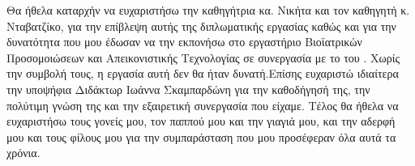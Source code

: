\begin{acknowledgements}
Θα ήθελα καταρχήν να ευχαριστήσω την καθηγήτρια κα. Νικήτα και 
τον καθηγητή κ. Νταβατζίκο, για την επίβλεψη αυτής της 
διπλωματικής εργασίας καθώς και για την δυνατότητα που μου έδωσαν
να την εκπονήσω στο εργαστήριο Βιοϊατρικών Προσομοιώσεων και 
Απεικονιστικής Τεχνολογίας σε συνεργασία με το  του . Χωρίς
την συμβολή τους, η εργασία αυτή δεν θα ήταν δυνατή.Επίσης 
ευχαριστώ ιδιαίτερα την υποψήφια Διδάκτωρ Ιωάννα Σκαμπαρδώνη για
την καθοδήγησή της, την πολύτιμη γνώση της και την εξαιρετική 
συνεργασία που είχαμε. Τέλος θα ήθελα να ευχαριστήσω τους γονείς
μου, τον παππού μου και την γιαγιά μου, και την αδερφή μου και
τους φίλους μου για την συμπαράσταση που μου προσέφεραν όλα αυτά
τα χρόνια.
\end{acknowledgements}